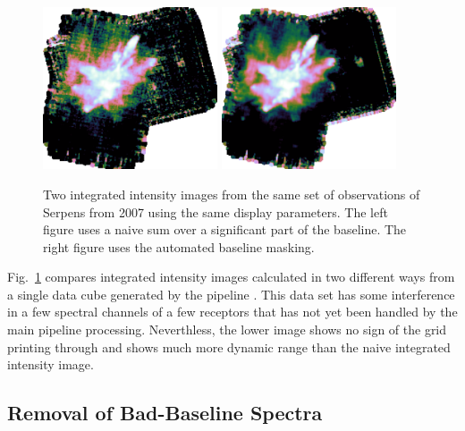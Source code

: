 \documentclass[final,authoryear,5p,times,twocolumn]{elsarticle}
\begin{document}
\begin{figure}
\begin{minipage}{\textwidth}
\centering
\includegraphics[width=0.46\textwidth]{integ_manual.png}
\includegraphics[width=0.46\textwidth]{integ_auto.png}
\caption{Two integrated intensity images from the same set of
  observations of Serpens from 2007 using the same display
  parameters. The left figure uses a naive sum over a significant part
  of the baseline. The right figure uses the automated baseline
  masking.}
\label{fig:integ}
\end{minipage}
\end{figure}

Fig.\ \ref{fig:integ} compares integrated intensity images calculated
in two different ways from a single data cube generated by the
pipeline \citep[see][for details of earlier
reductions of these data]{2010MNRAS.409.1412G,2010A&A...523A..29D}. This data set
has some interference in a few spectral channels of a few receptors
that has not yet been handled by the main pipeline
processing. Neverthless, the lower image shows no sign of the grid
printing through and shows much more dynamic range than the naive
integrated intensity image.

\subsection{Removal of Bad-Baseline Spectra}
\end{document}

